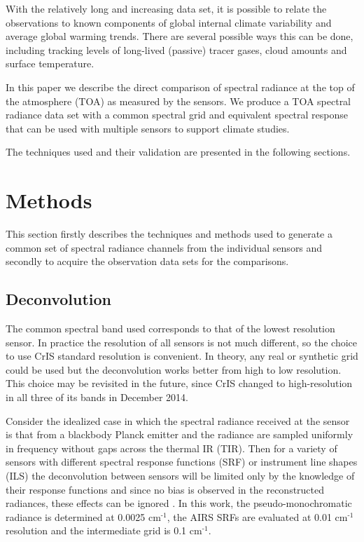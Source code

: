 \documentclass[11pt]{article}
\begin{document}
With the relatively long and increasing data set, it is possible to relate the  observations to known components of global internal climate variability and average global warming trends. There are several possible ways this can be done, including tracking levels of long-lived (passive) tracer gases, cloud amounts and surface temperature. 

In this paper we describe the direct comparison of spectral radiance at the top of the atmosphere (TOA) as measured by the sensors. We produce a TOA spectral radiance data set with a common spectral grid and equivalent spectral response that can be used with multiple sensors to support climate studies.

The techniques used and their validation are presented in the following sections.  

\section{Methods}
\label{sec:orgheadline6}

This section firstly describes the techniques and methods used to generate a common set of spectral radiance channels from the individual sensors and secondly to acquire the observation data sets for the comparisons. 

\subsection{Deconvolution}
\label{sec:orgheadline4}

The common spectral band used corresponds to that of the lowest resolution sensor. In practice the resolution of all sensors is not much different, so the choice to use CrIS standard resolution is convenient. In theory, any real or synthetic grid could be used but the deconvolution works better from high to low resolution. This choice may be revisited in the future, since CrIS changed to high-resolution in all three of its bands in December 2014.

Consider the idealized case in which the spectral radiance received at the sensor is that from a blackbody Planck emitter and the radiance are sampled uniformly in frequency without gaps across the thermal IR (TIR). Then for a variety of sensors with different spectral response functions (SRF) or instrument line shapes (ILS) the deconvolution between sensors will be limited only by the knowledge of their response functions and since no bias is observed in the reconstructed radiances, these effects can be ignored \cite{Motteler2017b}. In this work, the pseudo-monochromatic radiance is determined at 0.0025 cm\(^{\text{-1}}\), the AIRS SRFs are evaluated at 0.01 cm\(^{\text{-1}}\) resolution and the intermediate grid is 0.1 cm\(^{\text{-1}}\).
\end{document}

